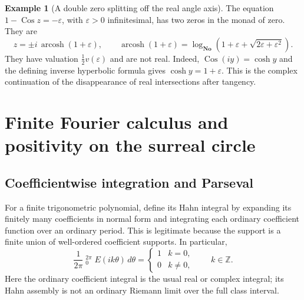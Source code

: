 \documentclass[11pt]{article}
\numberwithin{equation}{section}
\theoremstyle{definition}
\newtheorem{example}[theorem]{Example}
\newcommand{\No}{\mathbf{No}}
\newcommand{\Z}{\mathbb Z}
\newcommand{\eps}{\varepsilon}
\newcommand{\arcosh}{\operatorname{arcosh}}
\newcommand{\Cos}{\operatorname{Cos}}
\newcommand{\HInt}{\mathop{\overset{\scriptscriptstyle H}{\int}}\nolimits}
\begin{document}
\begin{example}[A double zero splitting off the real angle axis]
The equation $1-\Cos z=-\eps$, with $\eps>0$ infinitesimal, has two zeros in the monad of zero. They are
\[
 z=\pm i\,\arcosh(1+\eps),
 \qquad
 \arcosh(1+\eps)=\log_{\No}\left(1+\eps+\sqrt{2\eps+\eps^2}\right).
\]
They have valuation $\tfrac12v(\eps)$ and are not real. Indeed, $\Cos(iy)=\cosh y$ and the defining inverse hyperbolic formula gives $\cosh y=1+\eps$. This is the complex continuation of the disappearance of real intersections after tangency.
\end{example}

\section{Finite Fourier calculus and positivity on the surreal circle}\label{sec:fourier}
\subsection{Coefficientwise integration and Parseval}
For a finite trigonometric polynomial, define its Hahn integral by expanding its finitely many coefficients in normal form and integrating each ordinary coefficient function over an ordinary period. This is legitimate because the support is a finite union of well-ordered coefficient supports. In particular,
\begin{equation}\label{eq:orthogonality}
 \frac1{2\pi}\HInt_0^{2\pi}E(ik\theta)\,d\theta
 =\begin{cases}1&k=0,\\0&k\ne0,\end{cases}
 \qquad k\in\Z.
\end{equation}
Here the ordinary coefficient integral is the usual real or complex integral; its Hahn assembly is not an ordinary Riemann limit over the full class interval.
\end{document}
